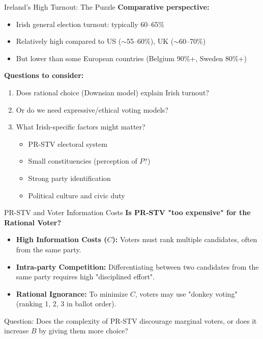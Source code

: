 \documentclass[10pt]{beamer}
\begin{document}
\begin{frame}{Ireland's High Turnout: The Puzzle}
\textbf{Comparative perspective:}
\begin{itemize}
\item Irish general election turnout: typically 60--65\%
\item Relatively high compared to US ($\sim$55--60\%), UK ($\sim$60--70\%)
\item But lower than some European countries (Belgium 90\%+, Sweden 80\%+)
\end{itemize}



\textbf{Questions to consider:}
\begin{enumerate}
\item Does rational choice (Downsian model) explain Irish turnout?
\item Or do we need expressive/ethical voting models?
\item What Irish-specific factors might matter?
\begin{itemize}
\item PR-STV electoral system
\item Small constituencies (perception of $P$?)
\item Strong party identification
\item Political culture and civic duty
\end{itemize}
\end{enumerate}
\end{frame}

\begin{frame}{PR-STV and Voter Information Costs}
\textbf{Is PR-STV "too expensive" for the Rational Voter?}
\begin{itemize}
\item \textbf{High Information Costs ($C$):} Voters must rank multiple candidates, often from the same party.
\item \textbf{Intra-party Competition:} Differentiating between two candidates from the same party requires high "disciplined effort".
\item \textbf{Rational Ignorance:} To minimize $C$, voters may use "donkey voting" (ranking 1, 2, 3 in ballot order).
\end{itemize}



\alert{Question:} Does the complexity of PR-STV discourage marginal voters, or does it increase $B$ by giving them more choice?
\end{frame}
\end{document}

